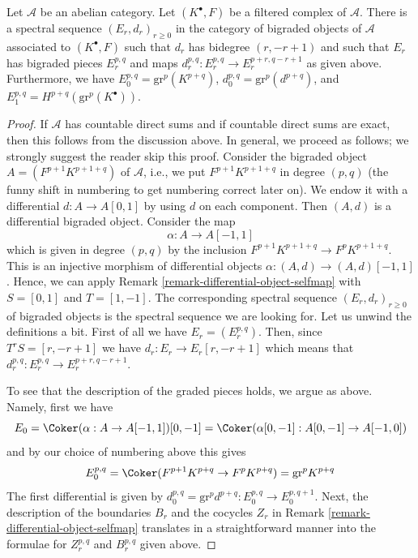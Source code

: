 \begin{lemma}
\label{lemma-spectral-sequence-filtered-complex}
Let $\mathcal{A}$ be an abelian category. Let $(K^\bullet, F)$ be a
filtered complex of $\mathcal{A}$. There is a spectral sequence
$(E_r, d_r)_{r \geq 0}$ in the category of bigraded objects of $\mathcal{A}$
associated to $(K^\bullet, F)$ such that $d_r$ has bidegree $(r, - r + 1)$
and such that $E_r$ has bigraded pieces $E_r^{p, q}$ and maps
$d_r^{p, q} : E_r^{p, q} \to E_r^{p + r, q - r + 1}$ as given above.
Furthermore, we have $E_0^{p, q} = \text{gr}^p(K^{p + q})$,
$d_0^{p, q} = \text{gr}^p(d^{p + q})$,
and $E_1^{p, q} = H^{p + q}(\text{gr}^p(K^\bullet))$.
\end{lemma}

\begin{proof}
If $\mathcal{A}$ has countable direct sums and if countable direct
sums are exact, then this follows from the discussion above.
In general, we proceed as follows; we strongly suggest the reader
skip this proof. Consider the bigraded object $A = (F^{p + 1}K^{p + 1 + q})$
of $\mathcal{A}$, i.e., we put $F^{p + 1}K^{p + 1 + q}$ in degree $(p, q)$
(the funny shift in numbering to get numbering correct later on).
We endow it with a differential $d : A \to A[0, 1]$ by using $d$
on each component. Then $(A, d)$ is a differential bigraded object.
Consider the map
$$
\alpha : A \to A[-1, 1]
$$
which is given in degree $(p, q)$ by the inclusion
$F^{p + 1}K^{p + 1 + q} \to F^pK^{p + 1 + q}$.
This is an injective morphism of differential objects
$\alpha : (A, d) \to (A, d)[-1, 1]$. Hence, we can apply
Remark \ref{remark-differential-object-selfmap}
with $S = [0, 1]$ and $T = [1, -1]$.
The corresponding spectral sequence $(E_r, d_r)_{r \geq 0}$
of bigraded objects is the spectral sequence we are looking
for. Let us unwind the definitions a bit. First of all we have
$E_r = (E_r^{p, q})$. Then, since $T^rS = [r, -r + 1]$
we have $d_r : E_r \to E_r[r, -r + 1]$ which means that
$d_r^{p, q} : E_r^{p, q} \to E_r^{p + r, q - r + 1}$.

\medskip\noindent
To see that the description of the graded pieces holds, we argue
as above. Namely, first we have
$$
E_0 = \Coker(\alpha : A \to A[-1, 1])[0, -1] =
\Coker(\alpha[0, -1] : A[0, -1] \to A[-1, 0])
$$
and by our choice of numbering above this gives
$$
E_0^{p, q} = \Coker(F^{p + 1}K^{p + q} \to F^pK^{p + q}) = \text{gr}^pK^{p + q}
$$
The first differential is given by
$d_0^{p, q} = \text{gr}^pd^{p + q} : E_0^{p, q} \to E_0^{p, q + 1}$.
Next, the description of the boundaries $B_r$ and the cocycles $Z_r$
in Remark \ref{remark-differential-object-selfmap}
translates in a straightforward manner into the formulae
for $Z_r^{p, q}$ and $B_r^{p, q}$ given above.
\end{proof}

